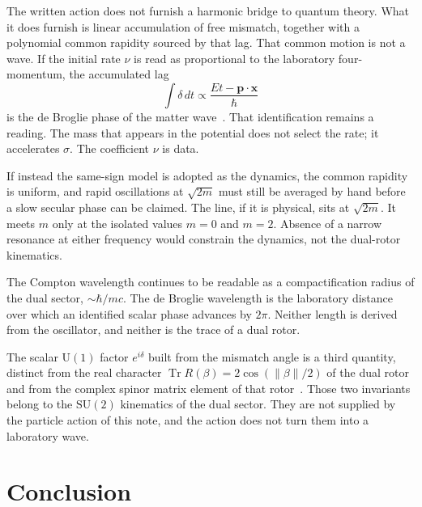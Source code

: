 \documentclass[a4paper]{article}
\begin{document}
The written action does not furnish a harmonic bridge to quantum theory. What it does furnish is linear accumulation of free mismatch, together with a polynomial common rapidity sourced by that lag. That common motion is not a wave. If the initial rate \(\nu\) is read as proportional to the laboratory four-momentum, the accumulated lag
\[
\int\delta\,dt
  \propto\frac{Et-\mathbf{p}\cdot\mathbf{x}}{\hbar}
\]
is the de Broglie phase of the matter wave~\cite{debroglie1924}. That identification remains a reading. The mass that appears in the potential does not select the rate; it accelerates \(\sigma\). The coefficient \(\nu\) is data.

If instead the same-sign model is adopted as the dynamics, the common rapidity is uniform, and rapid oscillations at \(\sqrt{2m}\) must still be averaged by hand before a slow secular phase can be claimed. The line, if it is physical, sits at \(\sqrt{2m}\). It meets \(m\) only at the isolated values \(m=0\) and \(m=2\). Absence of a narrow resonance at either frequency would constrain the dynamics, not the dual-rotor kinematics.

The Compton wavelength continues to be readable as a compactification radius of the dual sector, \(\sim\hbar/mc\). The de Broglie wavelength is the laboratory distance over which an identified scalar phase advances by \(2\pi\). Neither length is derived from the oscillator, and neither is the trace of a dual rotor.

The scalar \(\mathrm{U}(1)\) factor \(e^{i\delta}\) built from the mismatch angle is a third quantity, distinct from the real character \(\operatorname{Tr} R(\beta)=2\cos(\lVert\beta\rVert/2)\) of the dual rotor and from the complex spinor matrix element of that rotor~\cite{dst-de-broglie-wave}. Those two invariants belong to the \(\mathrm{SU}(2)\) kinematics of the dual sector. They are not supplied by the particle action of this note, and the action does not turn them into a laboratory wave.

\section{Conclusion}
\end{document}
